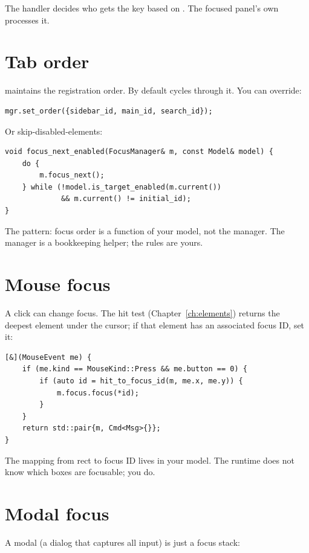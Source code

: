 The handler decides who gets the key based on
. The focused panel's own 
processes it.

\section{Tab order}

 maintains the registration order. By default
 cycles through it. You can override:

\begin{lstlisting}
mgr.set_order({sidebar_id, main_id, search_id});
\end{lstlisting}

Or skip-disabled-elements:

\begin{lstlisting}
void focus_next_enabled(FocusManager& m, const Model& model) {
    do {
        m.focus_next();
    } while (!model.is_target_enabled(m.current())
             && m.current() != initial_id);
}
\end{lstlisting}

The pattern: focus order is a function of your model, not the
manager. The manager is a bookkeeping helper; the rules are
yours.

\section{Mouse focus}

A click can change focus. The hit test
(Chapter~\ref{ch:elements}) returns the deepest element under
the cursor; if that element has an associated focus ID, set it:

\begin{lstlisting}
[&](MouseEvent me) {
    if (me.kind == MouseKind::Press && me.button == 0) {
        if (auto id = hit_to_focus_id(m, me.x, me.y)) {
            m.focus.focus(*id);
        }
    }
    return std::pair{m, Cmd<Msg>{}};
}
\end{lstlisting}

The mapping from rect to focus ID lives in your model. The
runtime does not know which boxes are focusable; you do.

\section{Modal focus}

A modal (a dialog that captures all input) is just a focus stack:

